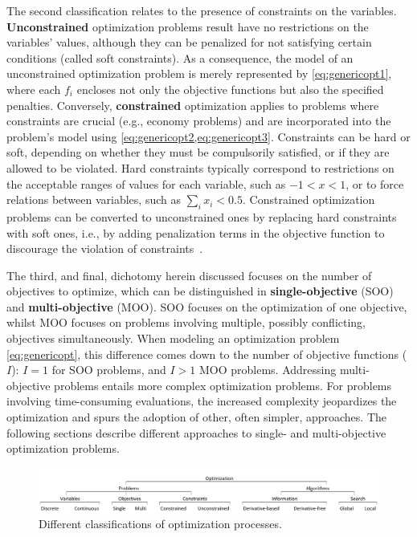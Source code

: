 	The second classification relates to the presence of constraints on the variables. \textbf{Unconstrained} optimization problems result have no restrictions on the variables' values, although they can be penalized for not satisfying certain conditions (called soft constraints). As a consequence, the model of an unconstrained optimization problem is merely represented by \cref{eq:genericopt1}, where each $f_i$ encloses not only the objective functions but also the specified penalties. Conversely, \textbf{constrained} optimization applies to problems where constraints are crucial (e.g., economy problems) and are incorporated into the problem's model using \cref{eq:genericopt2,eq:genericopt3}. Constraints can be hard or soft, depending on whether they must be compulsorily satisfied, or if they are allowed to be violated. Hard constraints typically correspond to restrictions on the acceptable ranges of values for each variable, such as $-1<x<1$, or to force relations between variables, such as $\sum_{i} x_i<0.5$. Constrained optimization problems can be converted to unconstrained ones by replacing hard constraints with soft ones, i.e., by adding penalization terms in the objective function to discourage the violation of constraints~\cite{Nocedal2011NumericalOptimization}. 
	
	The third, and final, dichotomy herein discussed focuses on the number of objectives to optimize, which can be distinguished in \textbf{single-objective} (\ac{SOO}) and \textbf{multi-objective} (\ac{MOO}). \ac{SOO} focuses on the optimization of one objective, whilst \ac{MOO} focuses on problems involving multiple, possibly conflicting, objectives simultaneously. When modeling an optimization problem \cref{eq:genericopt}, this difference comes down to the number of objective functions ($I$): $I=1$ for \ac{SOO} problems, and $I>1$ \ac{MOO} problems. Addressing multi-objective problems entails more complex optimization problems. For problems involving time-consuming evaluations, the increased complexity jeopardizes the optimization and spurs the adoption of other, often simpler, approaches. The following sections describe different approaches to single- and multi-objective optimization problems. 
	
	\begin{figure}
		\centering
		\includegraphics[width=\textwidth]{Images/Background/opt-classifications-h.PNG}
		\caption{Different classifications of optimization processes.}
		\label{fig:optclassification}
	\end{figure}
	
